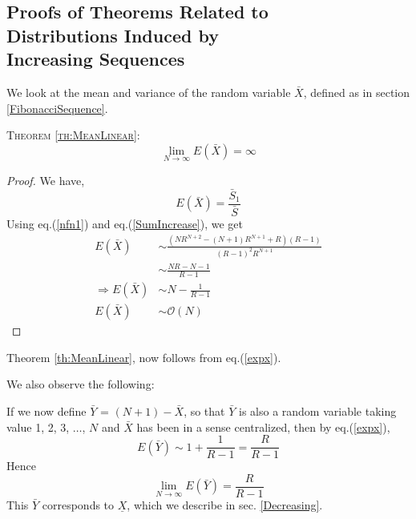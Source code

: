 \begin{multicols}{2}
\vspace{-.3cm}

\section{Proofs of Theorems Related to\\ Distributions Induced by\\ Increasing Sequences}\label{section-6}

\vspace{-.2cm}

We look at the mean and variance of the random variable $\bar{X}$, defined as in section \ref{FibonacciSequence}.

\textsc{Theorem {\ref{th:MeanLinear}}:}
\begin{equation*}
\displaystyle{\lim_{N \rightarrow \infty}} E(\bar{X}) = \infty  
 \end{equation*}
\begin{proof}\renewcommand{\qedsymbol}{} 
We have,
\begin{equation}
E(\bar{X}) = \frac{\bar{S}_1}{\bar{S}}\label{eq-6.1}
\end{equation}
Using eq.(\ref{nfn1}) and eq.(\ref{SumIncrease}), we get
\begin{align}
E(\bar{X})&\sim \frac{(NR^{N+2}-(N+1)R^{N+1}+R)(R-1)}{(R-1)^2 R^{N+1}}\nonumber\\
&\sim \frac{NR-N-1}{R-1}\nonumber\\
\Rightarrow E(\bar{X}) &\sim N - \frac{1}{R-1}\\\label{eq-6.2}
\nonumber E(\bar{X}) &\sim \mathcal{O}(N)
\end{align}
\end{proof}

\vspace{-.7cm}

Theorem \ref{th:MeanLinear}, now follows from eq.(\ref{expx}).

We also observe the following: 

 If we now define $\bar Y$ = $(N+1)- \bar{X}$, so that $\bar{Y}$ is also a random variable taking value 1, 2, 3, $\ldots$, $N$ and $\bar{X}$ has been in a sense centralized, then by eq.(\ref{expx}),
 \begin{equation*}
 E(\bar{Y}) \sim 1 + \frac{1}{R-1} = \frac{R}{R-1}
 \end{equation*}
Hence 
\begin{equation*}
\displaystyle{\lim_{N \rightarrow \infty}} E(\bar{Y}) = \frac{R}{R-1} 
\end{equation*}
This $\bar{Y}$ corresponds to $\underline{X}$, which we describe in sec. \ref{Decreasing}.


\end{multicols}
